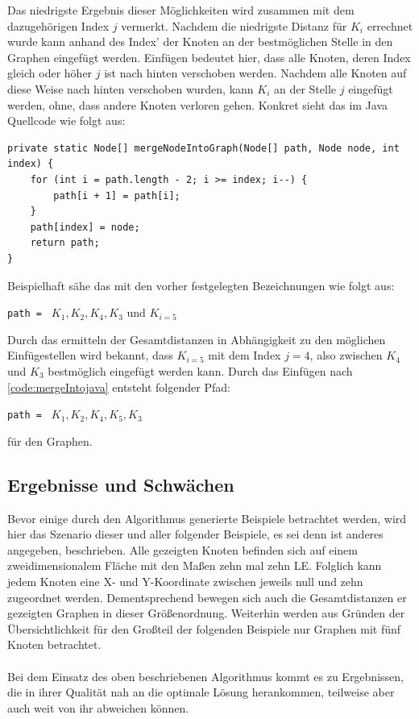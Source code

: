 Das niedrigste Ergebnis dieser Möglichkeiten wird zusammen mit dem dazugehörigen Index $j$ vermerkt. 
Nachdem die niedrigste Distanz für $K_i$ errechnet wurde kann anhand des Index' der Knoten an der bestmöglichen Stelle in den Graphen eingefügt werden. 
Einfügen bedeutet hier, dass alle Knoten, deren Index gleich oder höher $j$ ist nach hinten verschoben werden. 
Nachdem alle Knoten auf diese Weise nach hinten verschoben wurden, kann $K_i$ an der Stelle $j$ eingefügt werden, ohne, dass andere Knoten verloren gehen. 
Konkret sieht das im Java Quellcode wie folgt aus:
\begin{lstlisting}[caption={Einfügen von Knoten in einen bestehenden Graph}, label={code:mergeIntojava}]
private static Node[] mergeNodeIntoGraph(Node[] path, Node node, int index) {
    for (int i = path.length - 2; i >= index; i--) {
        path[i + 1] = path[i];
    }
    path[index] = node;
    return path;
}
\end{lstlisting}
Beispielhaft sähe das mit den vorher festgelegten Bezeichnungen wie folgt aus: 
\begin{addmargin}[1em]{2em}
\lstinline{path = } $K_1, K_2, K_4, K_3$ und $K_{i = 5}$ 
\end{addmargin}
Durch das ermitteln der Gesamtdistanzen in Abhängigkeit zu den möglichen Einfügestellen wird bekannt, dass $K_{i=5}$ mit dem Index $j=4$, also zwischen $K_4$ und $K_3$ bestmöglich eingefügt werden kann. 
Durch das Einfügen nach \vref{code:mergeIntojava} entsteht folgender Pfad:
\begin{addmargin}[1em]{2em}
\lstinline{path = } $K_1, K_2, K_4, K_5, K_3$
\end{addmargin}
für den Graphen.

\subsection{Ergebnisse und Schwächen} \label{sec:inserst-first-erg}
Bevor einige durch den Algorithmus generierte Beispiele betrachtet werden, wird hier das Szenario dieser und aller folgender Beispiele, es sei denn ist anderes angegeben, beschrieben.
Alle gezeigten Knoten befinden sich auf einem zweidimensionalem Fläche mit den Maßen zehn mal zehn \ac{LE}.
Folglich kann jedem Knoten eine X- und Y-Koordinate zwischen jeweils null und zehn zugeordnet werden. 
Dementsprechend bewegen sich auch die Gesamtdistanzen er gezeigten Graphen in dieser Größenordnung.
Weiterhin werden aus Gründen der Übersichtlichkeit für den Großteil der folgenden Beispiele nur Graphen mit fünf Knoten betrachtet.
\\\\
Bei dem Einsatz des oben beschriebenen Algorithmus kommt es zu Ergebnissen, die in ihrer Qualität nah an die optimale Lösung herankommen, teilweise aber auch weit von ihr abweichen können.  

